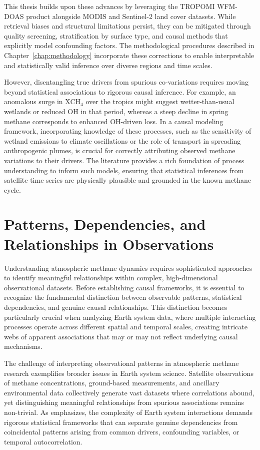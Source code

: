 This thesis builds upon these advances by leveraging the TROPOMI WFM-DOAS product alongside MODIS and Sentinel-2 land cover datasets. While retrieval biases and structural limitations persist, they can be mitigated through quality screening, stratification by surface type, and causal methods that explicitly model confounding factors. The methodological procedures described in Chapter~\ref{chap:methodology} incorporate these corrections to enable interpretable and statistically valid inference over diverse regions and time scales.

However, disentangling true drivers from spurious co-variations requires moving beyond statistical associations to rigorous causal inference. For example, an anomalous surge in XCH$_4$ over the tropics might suggest wetter-than-usual wetlands or reduced OH in that period, whereas a steep decline in spring methane corresponds to enhanced OH-driven loss. In a causal modeling framework, incorporating knowledge of these processes, such as the sensitivity of wetland emissions to climate oscillations or the role of transport in spreading anthropogenic plumes, is crucial for correctly attributing observed methane variations to their drivers. The literature provides a rich foundation of process understanding to inform such models, ensuring that statistical inferences from satellite time series are physically plausible and grounded in the known methane cycle.

\section{Patterns, Dependencies, and Relationships in Observations}

Understanding atmospheric methane dynamics requires sophisticated approaches to identify meaningful relationships within complex, high-dimensional observational datasets. Before establishing causal frameworks, it is essential to recognize the fundamental distinction between observable patterns, statistical dependencies, and genuine causal relationships. This distinction becomes particularly crucial when analyzing Earth system data, where multiple interacting processes operate across different spatial and temporal scales, creating intricate webs of apparent associations that may or may not reflect underlying causal mechanisms.

The challenge of interpreting observational patterns in atmospheric methane research exemplifies broader issues in Earth system science. Satellite observations of methane concentrations, ground-based measurements, and ancillary environmental data collectively generate vast datasets where correlations abound, yet distinguishing meaningful relationships from spurious associations remains non-trivial. As \cite{Runge2019} emphasizes, the complexity of Earth system interactions demands rigorous statistical frameworks that can separate genuine dependencies from coincidental patterns arising from common drivers, confounding variables, or temporal autocorrelation.

